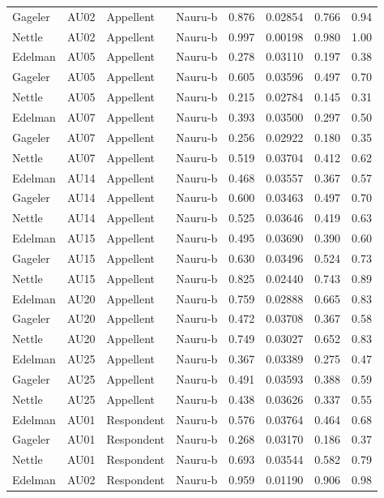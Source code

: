 \documentclass{monashthesis}
\begin{document}
\begin{center}
\begin{longtable}{llllllll}
Gageler & AU02 & Appellent & Nauru-b & 0.876 & 0.02854 & 0.766 & 0.94 \\
Nettle & AU02 & Appellent & Nauru-b & 0.997 & 0.00198 & 0.980 & 1.00 \\
Edelman & AU05 & Appellent & Nauru-b & 0.278 & 0.03110 & 0.197 & 0.38 \\
Gageler & AU05 & Appellent & Nauru-b & 0.605 & 0.03596 & 0.497 & 0.70 \\
Nettle & AU05 & Appellent & Nauru-b & 0.215 & 0.02784 & 0.145 & 0.31 \\
Edelman & AU07 & Appellent & Nauru-b & 0.393 & 0.03500 & 0.297 & 0.50 \\
Gageler & AU07 & Appellent & Nauru-b & 0.256 & 0.02922 & 0.180 & 0.35 \\
Nettle & AU07 & Appellent & Nauru-b & 0.519 & 0.03704 & 0.412 & 0.62 \\
Edelman & AU14 & Appellent & Nauru-b & 0.468 & 0.03557 & 0.367 & 0.57 \\
Gageler & AU14 & Appellent & Nauru-b & 0.600 & 0.03463 & 0.497 & 0.70 \\
Nettle & AU14 & Appellent & Nauru-b & 0.525 & 0.03646 & 0.419 & 0.63 \\
Edelman & AU15 & Appellent & Nauru-b & 0.495 & 0.03690 & 0.390 & 0.60 \\
Gageler & AU15 & Appellent & Nauru-b & 0.630 & 0.03496 & 0.524 & 0.73 \\
Nettle & AU15 & Appellent & Nauru-b & 0.825 & 0.02440 & 0.743 & 0.89 \\
Edelman & AU20 & Appellent & Nauru-b & 0.759 & 0.02888 & 0.665 & 0.83 \\
Gageler & AU20 & Appellent & Nauru-b & 0.472 & 0.03708 & 0.367 & 0.58 \\
Nettle & AU20 & Appellent & Nauru-b & 0.749 & 0.03027 & 0.652 & 0.83 \\
Edelman & AU25 & Appellent & Nauru-b & 0.367 & 0.03389 & 0.275 & 0.47 \\
Gageler & AU25 & Appellent & Nauru-b & 0.491 & 0.03593 & 0.388 & 0.59 \\
Nettle & AU25 & Appellent & Nauru-b & 0.438 & 0.03626 & 0.337 & 0.55 \\
Edelman & AU01 & Respondent & Nauru-b & 0.576 & 0.03764 & 0.464 & 0.68 \\
Gageler & AU01 & Respondent & Nauru-b & 0.268 & 0.03170 & 0.186 & 0.37 \\
Nettle & AU01 & Respondent & Nauru-b & 0.693 & 0.03544 & 0.582 & 0.79 \\
Edelman & AU02 & Respondent & Nauru-b & 0.959 & 0.01190 & 0.906 & 0.98 \\

\end{longtable}
\end{center}
\end{document}
